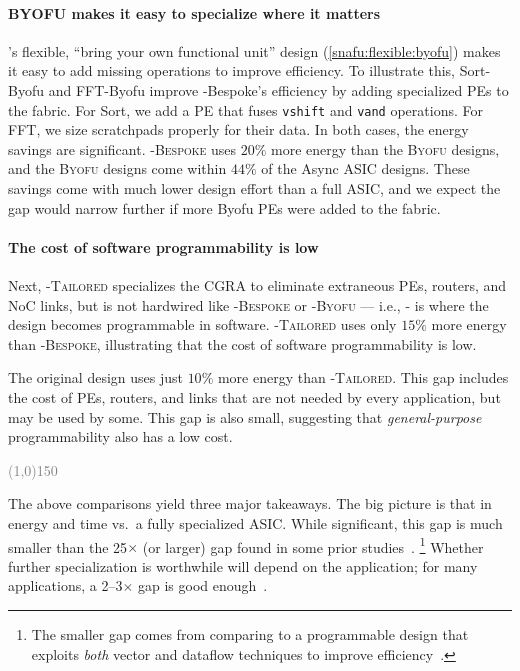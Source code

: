 \paragraph{BYOFU makes it easy to specialize where it matters}
\snafu's flexible, ``bring your own functional unit'' design
(\autoref{snafu:flexible:byofu}) makes it easy to add missing operations
to improve efficiency.
%
To illustrate this,
Sort-{\sc Byofu} and FFT-{\sc Byofu}
improve {\sc \snafu-Bespoke}'s efficiency by adding specialized PEs to the fabric.
% 
For Sort, we add a PE that fuses {\tt vshift} and {\tt vand} operations.
% 
For FFT, we size scratchpads properly for their data.
% 
In both cases, the energy savings are significant.
% 
{\scshape \snafu-Bespoke} uses $20\%$ more energy than the {\scshape Byofu} designs, and the {\scshape Byofu} designs come within $44\%$ of the {\sc Async} ASIC designs.
%
These savings come with much lower design effort than a full ASIC, and we
expect the gap would narrow further if more {\sc Byofu} PEs were added to the fabric.
%

\paragraph{The cost of software programmability is low}
Next, {\scshape \snafu-Tailored} specializes the CGRA to eliminate
extraneous PEs, routers, and NoC links, but is not hardwired like {\scshape \snafu-Bespoke} or {\scshape \snafu-Byofu} ---
%
i.e., \snafu- is where the design becomes programmable in software.
% 
{\scshape \snafu-Tailored} uses only $15\%$ more energy than {\scshape
\snafu-Bespoke}, illustrating that the cost of software programmability is low.


The original \snafuarch design uses just $10\%$ more energy
than {\scshape \snafu-Tailored}.
%
This gap includes the cost of PEs, routers, and links that are
not needed by every application, but may be used by some.
%
This gap is also small, suggesting that \emph{general-purpose}
programmability also has a low cost.
%

\newcommand{\hbreak}{\vspace{-0.6em}\begin{center}\textcolor{gray}{\line(1,0){150}}\end{center}\vspace{-0.1em}}

\hbreak

The above comparisons yield three major takeaways.
%
The big picture is that  in energy and time vs.\ a fully specialized ASIC.
%
While significant, this gap is much smaller than the 25$\times$ (or larger) gap found in some prior studies~\cite{hameed2010understanding}.%
%
\footnote{The smaller gap comes from comparing to a programmable design that
exploits \emph{both} vector and dataflow techniques to improve
efficiency~\cite{nowatzki2017domain,nowatzki2016dsa}.}
%
Whether further specialization is worthwhile will depend on the application;
for many applications, a 2--3$\times$ gap is good enough~\cite{hotmobile2021}.


